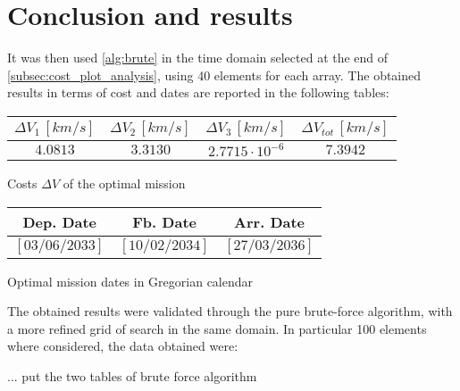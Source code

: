 \section{Conclusion and results}
\label{sec:conclusion}

It was then used \autoref{alg:brute} in the time domain selected at the end of \autoref{subsec:cost_plot_analysis},  using 40 elements for each array. The obtained results in terms of cost and dates are reported in the following tables:

\vspace{0.5cm}

\begin{minipage}{0.5\linewidth}
    \centering
    \captionsetup{type=table}
    \begin{tabular}{|c|c|c|c|}
        \hline
        $\Delta V_1 \, [km/s]$ & $\Delta V_2 \, [km/s]$ & $\Delta V_3 \, [km/s]$ & $\Delta V_{tot} \, [km/s]$\\
        \hline
        $4.0813$ & $3.3130$ & $2.7715 \cdot 10^{-6}$ & $7.3942$\\
        \hline
    \end{tabular}
    \caption{Costs $\Delta V$ of the optimal mission}
    \label{table:cost_optimal}
\end{minipage}\hfill
\begin{minipage}{0.5\linewidth}
    \centering
    \captionsetup{type=table}
    \begin{tabular}{|c|c|c|}
        \hline
        Dep. Date & Fb. Date & Arr. Date \\
        \hline
        $\left[03/06/2033 \right]$ & $\left[10/02/2034\right]$ & $\left[27/03/2036\right]$ \\
        \hline
    \end{tabular}
    \caption{Optimal mission dates in Gregorian calendar}
    \label{table:date_optimal}
\end{minipage}
\vspace*{5pt}

The obtained results were validated through the pure brute-force algorithm, with a more refined grid of search in the same domain. In particular 100 elements where considered, the data obtained were:

... put the two tables of brute force algorithm

